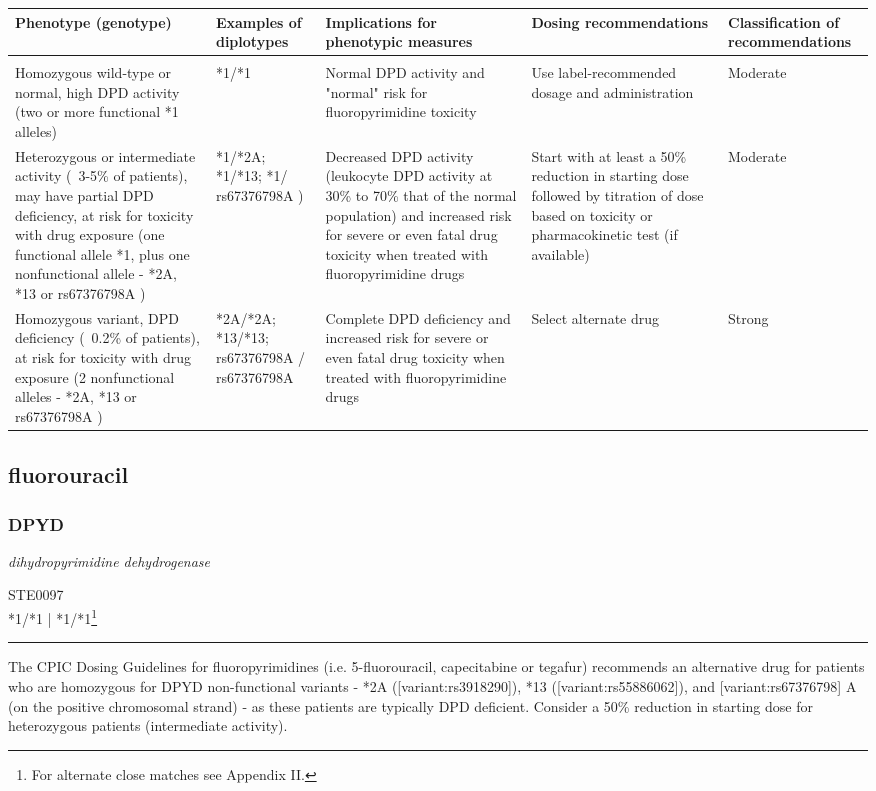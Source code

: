 \documentclass{report}
\begin{document}
      \begin{tabularx}{\textwidth}{ XXXXX }
      \textbf{ Phenotype (genotype) }&\textbf{ Examples of diplotypes }&\textbf{ Implications for phenotypic measures }&\textbf{ Dosing recommendations }&\textbf{ Classification of recommendations  } \\ \hline \\  Homozygous wild-type or normal, high DPD activity (two or more functional *1 alleles) & *1/*1 & Normal DPD activity and "normal" risk for fluoropyrimidine toxicity & Use label-recommended dosage and administration & Moderate  \\  Heterozygous or intermediate activity (~3-5\% of patients), may have partial DPD deficiency, at risk for toxicity with drug exposure (one functional allele *1, plus one nonfunctional allele - *2A, *13 or rs67376798A ) & *1/*2A; *1/*13; *1/ rs67376798A ) & Decreased DPD activity (leukocyte DPD activity at 30\% to 70\% that of the normal population) and increased risk for severe or even fatal drug toxicity when treated with fluoropyrimidine drugs & Start with at least a 50\% reduction in starting dose followed by titration of dose based on toxicity  or pharmacokinetic test (if available) & Moderate  \\  Homozygous variant, DPD deficiency (~0.2\% of patients), at risk for toxicity with drug exposure (2 nonfunctional alleles - *2A, *13 or rs67376798A ) & *2A/*2A; *13/*13; rs67376798A  / rs67376798A  & Complete DPD deficiency and increased risk for severe or even fatal drug toxicity when treated with fluoropyrimidine drugs & Select alternate drug & Strong  \\ 
      \end{tabularx}
      
      \newpage
      \normalsize



\subsection{ fluorouracil }

\subsubsection{ DPYD }
     \textit{ dihydropyrimidine dehydrogenase } \begin{flushright} \textsc{ STE0097 \\ *1/*1  | *1/*1\footnote{For alternate close matches see Appendix II.} }\end{flushright}
      \hrule \vspace{6pt}
      The CPIC Dosing Guidelines for fluoropyrimidines (i.e. 5-fluorouracil, capecitabine or tegafur) recommends an alternative drug for patients who are homozygous for DPYD non-functional variants - *2A ([variant:rs3918290]), *13 ([variant:rs55886062]), and [variant:rs67376798] A (on the positive chromosomal strand) - as these patients are typically DPD deficient.  Consider a 50\% reduction in starting dose for heterozygous patients (intermediate activity). \newline
      \scriptsize
      
\end{document}
